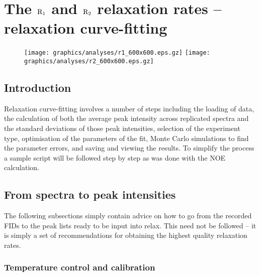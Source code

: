 
\chapter[Relaxation curve-fitting]{The $\mathrm{R}_1$ and $\mathrm{R}_2$ relaxation rates -- relaxation curve-fitting} \label{ch: relax-fit}


\begin{figure*}[h]
\texttt{[image: graphics/analyses/r1\_600x600.eps.gz]} \hfill \texttt{[image: graphics/analyses/r2\_600x600.eps.gz]}
\end{figure*}



\section{Introduction}

Relaxation curve-fitting involves a number of steps including the loading of data, the calculation of both the average peak intensity across replicated spectra and the standard deviations of those peak intensities, selection of the experiment type, optimisation of the parameters of the fit, Monte Carlo simulations to find the parameter errors, and saving and viewing the results.  To simplify the process a sample script will be followed step by step as was done with the NOE calculation.




\section{From spectra to peak intensities} \label{sect: spectra to intensities}

The following subsections simply contain advice on how to go from the recorded FIDs to the peak lists ready to be input into relax.  This need not be followed -- it is simply a set of recommendations for obtaining the highest quality relaxation rates.



\subsection{Temperature control and calibration} \label{sect: temperature control and calibration}

